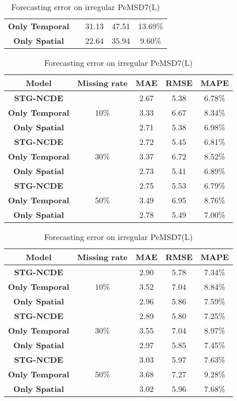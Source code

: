 \documentclass[letterpaper]{article} \usepackage{aaai22}  \usepackage{times}  \usepackage{helvet}  \usepackage{courier}  \usepackage[hyphens]{url}  \usepackage{graphicx} \urlstyle{rm} \def\UrlFont{\rm}  \usepackage{natbib}  \usepackage{caption} \DeclareCaptionStyle{ruled}{labelfont=normalfont,labelsep=colon,strut=off} \frenchspacing  \setlength{\pdfpagewidth}{8.5in}  \setlength{\pdfpageheight}{11in}  \usepackage{stfloats}
\begin{document}
\begin{table}[!ht]
\begin{tabular}{cc ccc}
\textbf{Only Temporal} &                      & 31.13  & 47.51  & 13.69\% \\
\textbf{Only Spatial } &                      & 22.64  & 35.94  &  9.60\% \\\hline
\end{tabular}
\vspace{1em}
\centering
\setlength{\tabcolsep}{4pt}
\caption{Forecasting error on irregular PeMSD7(M)}\label{tbl:missing_pemsd7m}
\begin{tabular}{cc ccc}
\hline
Model                  & Missing rate         &  MAE  &     RMSE    &   MAPE  \\ \hline
\textbf{STG-NCDE}      & \multirow{3}{*}{10\%}& 2.67  & 5.38  & 6.78\% \\
\textbf{Only Temporal} &                      & 3.33  & 6.67  & 8.34\% \\
\textbf{Only Spatial } &                      & 2.71  & 5.38  & 6.98\% \\\hline
\textbf{STG-NCDE}      & \multirow{3}{*}{30\%}& 2.72  & 5.45  & 6.81\% \\
\textbf{Only Temporal} &                      & 3.37  & 6.72  & 8.52\% \\
\textbf{Only Spatial } &                      & 2.73  & 5.41  & 6.89\% \\\hline
\textbf{STG-NCDE}      & \multirow{3}{*}{50\%}& 2.75  & 5.53  & 6.79\% \\
\textbf{Only Temporal} &                      & 3.49  & 6.95  & 8.76\% \\
\textbf{Only Spatial } &                      & 2.78  & 5.49  & 7.00\% \\\hline
\end{tabular}\vspace{1em}
\centering
\setlength{\tabcolsep}{4pt}
\caption{Forecasting error on irregular PeMSD7(L)}\label{tbl:missing_pemsd7l}
\begin{tabular}{cc ccc}
\hline
Model                  & Missing rate         &  MAE   &     RMSE    &   MAPE  \\ \hline
\textbf{STG-NCDE}      & \multirow{3}{*}{10\%}& 2.90  & 5.78  & 7.34\% \\
\textbf{Only Temporal} &                      & 3.52  & 7.04  & 8.84\% \\ 
\textbf{Only Spatial } &                      & 2.96  & 5.86  & 7.59\% \\\hline
\textbf{STG-NCDE}      & \multirow{3}{*}{30\%}& 2.89  & 5.80  & 7.25\% \\
\textbf{Only Temporal} &                      & 3.55  & 7.04  & 8.97\% \\
\textbf{Only Spatial } &                      & 2.97  & 5.85  & 7.45\% \\\hline
\textbf{STG-NCDE}      & \multirow{3}{*}{50\%}& 3.03  & 5.97  & 7.63\% \\
\textbf{Only Temporal} &                      & 3.68  & 7.27  & 9.28\% \\
\textbf{Only Spatial } &                      & 3.02  & 5.96  & 7.68\% \\\hline
\end{tabular}\end{table}
\end{document}
